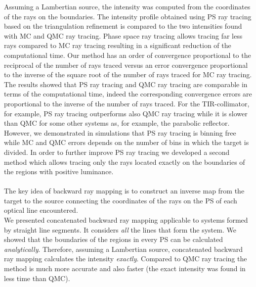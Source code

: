 Assuming a Lambertian source, the intensity was computed from the coordinates of the rays on the boundaries. 
The intensity profile obtained using PS ray tracing based on the triangulation refinement is compared to the two intensities found with MC and QMC ray tracing. Phase space ray tracing allows tracing far less rays compared to MC ray tracing resulting in a significant reduction of the computational time. Our method has an order of convergence proportional to the reciprocal of the number of rays traced versus an error convergence proportional to the inverse of the square root of the number of rays traced for MC ray tracing. The results showed that PS ray tracing and QMC ray tracing are comparable in terms of the computational time, indeed the corresponding convergence errors are proportional to the inverse of the number of rays traced. For the TIR-collimator, for example, PS ray tracing outperforms also QMC ray tracing while it is slower than QMC for some other systems as, for example, the parabolic reflector. However, we demonstrated in simulations that PS ray tracing is binning free while MC and QMC errors depends on the number of bins in which the target is divided.
In order to further improve PS ray tracing we developed a second method which allows tracing only the rays located exactly on the boundaries of the regions with positive luminance. 
\\ \\ \indent The key idea of backward ray mapping is to construct an inverse map from the target to the source connecting the coordinates of the rays on the PS of each optical line encountered. \\ \indent 
We presented concatenated backward ray mapping applicable to systems formed by straight line segments. It considers \textit{all} the lines that form the system. We showed that the boundaries of the regions in every PS can be calculated \textit{analytically}. Therefore, assuming a Lambertian source, concatenated backward ray mapping calculates the intensity \textit{exactly}. Compared to QMC ray tracing the method is much more accurate and also faster (the exact intensity was found in less time than QMC). 

